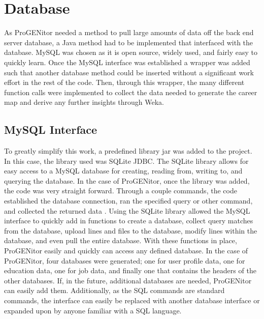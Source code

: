 \section{Database}
\label{sect:database}
As ProGENitor needed a method to pull large amounts of data off the back end
server database, a Java method had to be implemented that interfaced with
the database.  MySQL was chosen as it is open source, widely used, and fairly
easy to quickly learn.  Once the MySQL interface was established a wrapper was
added such that another database method could be inserted without a significant
work effort in the rest of the code.  Then, through this wrapper, the many
different function calls were implemented to collect the data needed to generate
the career map and derive any further insights through Weka.

\subsection{MySQL Interface}
To greatly simplify this work, a predefined library jar was added
to the project.  In this case, the library used was SQLite JDBC.  The SQLite
library allows for easy access to a MySQL database for creating, reading from,
writing to, and querying the database.  In the case of ProGENitor, once the
library was added, the code was very straight forward.  Through a couple
commands, the code established the database connection, ran the specified query
or other command, and collected the returned data \cite{sqlite}.  Using the
SQLite library allowed the MySQL interface to quickly add in functions to create
a database, collect query matches from the database, upload lines and files to
the database, modify lines within the database, and even pull the entire
database.  With these functions in place, ProGENitor easily and quickly can
access any defined database.  In the case of ProGENitor, four databases were
generated; one for user profile data, one for education data, one for job data,
and finally one that contains the headers of the other databases.  If, in the
future, additional databases are needed, ProGENitor can easily add them. 
Additionally, as the SQL commands are standard commands, the interface can
easily be replaced with another database interface or expanded upon by anyone
familiar with a SQL language.


